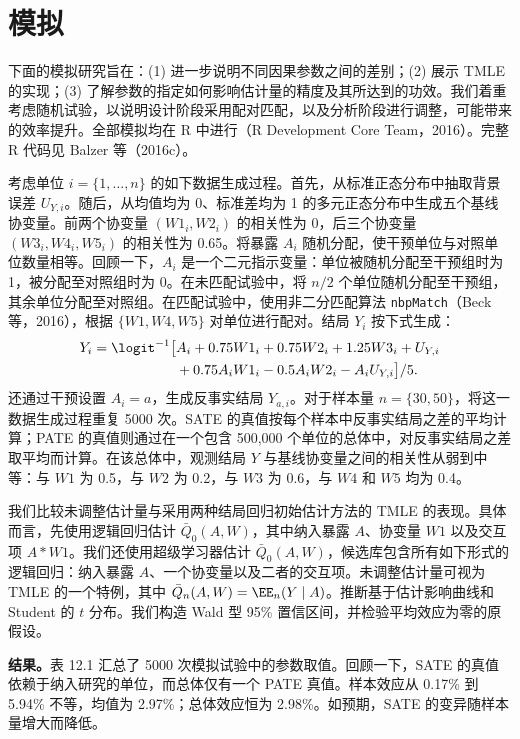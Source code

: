 \section{模拟}

下面的模拟研究旨在：(1) 进一步说明不同因果参数之间的差别；(2) 展示 TMLE 的实现；(3) 了解参数的指定如何影响估计量的精度及其所达到的功效。我们着重考虑随机试验，以说明设计阶段采用配对匹配，以及分析阶段进行调整，可能带来的效率提升。全部模拟均在 R 中进行（R Development Core Team，2016）。完整 R 代码见 Balzer 等（2016c）。

考虑单位 $i=\{1,\ldots,n\}$ 的如下数据生成过程。首先，从标准正态分布中抽取背景误差 $U_{Y,i}$。随后，从均值均为 0、标准差均为 1 的多元正态分布中生成五个基线协变量。前两个协变量 $(W1_i,W2_i)$ 的相关性为 0，后三个协变量 $(W3_i,W4_i,W5_i)$ 的相关性为 0.65。将暴露 $A_i$ 随机分配，使干预单位与对照单位数量相等。回顾一下，$A_i$ 是一个二元指示变量：单位被随机分配至干预组时为 1，被分配至对照组时为 0。在未匹配试验中，将 $n/2$ 个单位随机分配至干预组，其余单位分配至对照组。在匹配试验中，使用非二分匹配算法 \texttt{nbpMatch}（Beck 等，2016），根据 $\{W1,W4,W5\}$ 对单位进行配对。结局 $Y_i$ 按下式生成：
\[
\begin{aligned}
Y_i=\logit^{-1}\bigl[&A_i+0.75W1_i+0.75W2_i+1.25W3_i+U_{Y,i}\\
&+0.75A_iW1_i-0.5A_iW2_i-A_iU_{Y,i}\bigr]/5.
\end{aligned}
\]
还通过干预设置 $A_i=a$，生成反事实结局 $Y_{a,i}$。对于样本量 $n=\{30,50\}$，将这一数据生成过程重复 5000 次。SATE 的真值按每个样本中反事实结局之差的平均计算；PATE 的真值则通过在一个包含 500,000 个单位的总体中，对反事实结局之差取平均而计算。在该总体中，观测结局 $Y$ 与基线协变量之间的相关性从弱到中等：与 $W1$ 为 0.5，与 $W2$ 为 0.2，与 $W3$ 为 0.6，与 $W4$ 和 $W5$ 均为 0.4。

我们比较未调整估计量与采用两种结局回归初始估计方法的 TMLE 的表现。具体而言，先使用逻辑回归估计 $\bar Q_0(A,W)$，其中纳入暴露 $A$、协变量 $W1$ 以及交互项 $A*W1$。我们还使用超级学习器估计 $\bar Q_0(A,W)$，候选库包含所有如下形式的逻辑回归：纳入暴露 $A$、一个协变量以及二者的交互项。未调整估计量可视为 TMLE 的一个特例，其中 $\bar Q_n(A,W)=\EE_n(Y\mid A)$。推断基于估计影响曲线和 Student 的 $t$ 分布。我们构造 Wald 型 95\% 置信区间，并检验平均效应为零的原假设。

\noindent\textbf{结果。}表 12.1 汇总了 5000 次模拟试验中的参数取值。回顾一下，SATE 的真值依赖于纳入研究的单位，而总体仅有一个 PATE 真值。样本效应从 0.17\% 到 5.94\% 不等，均值为 2.97\%；总体效应恒为 2.98\%。如预期，SATE 的变异随样本量增大而降低。

